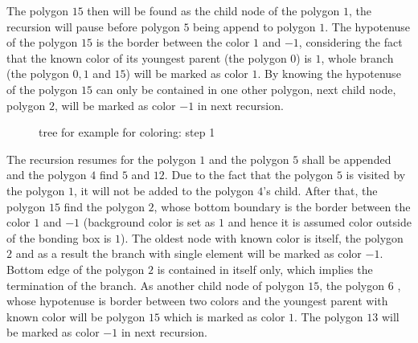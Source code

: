 The polygon $15$ then will be found as the child node of the polygon $1$, the recursion will pause before polygon $5$ being append to polygon $1$.
The hypotenuse of the polygon $15$ is the border between the color $1$ and $-1$, considering the fact that the known color of its youngest parent (the polygon $0$) is $1$, whole branch (the polygon $0,1$ and $15$) will be marked as color $1$.
By knowing the hypotenuse of the polygon $15$ can only be contained in one other polygon, next child node, polygon $2$, will be marked as color $-1$ in next recursion.
    \begin{figure}[h!]
        \centering
        \caption[Tree for example for coloring: step 1]{tree for example for coloring: step 1}
        \label{qdt_fig:qdt_color_tree_0}
    \end{figure}
The recursion resumes for the polygon $1$ and the polygon $5$ shall be appended and the polygon $4$ find $5$ and $12$.
Due to the fact that the polygon $5$ is visited by the polygon $1$, it will not be added to the polygon $4$'s child.
After that, the polygon $15$ find the polygon $2$, whose bottom boundary is the border between the color $1$ and $-1$ (background color is set as $1$ and hence it is assumed color outside of the bonding box is $1$).
The oldest node with known color is itself, the polygon $2$ and as a result the branch with single element will be marked as color $-1$.
Bottom edge of the polygon $2$ is contained in itself only, which implies the termination of the branch.
As another child node of polygon $15$, the polygon $6$ , whose hypotenuse is border between two colors and the youngest parent with known color will be polygon $15$ which is marked as color $1$.
The polygon $13$ will be marked as color $-1$ in next recursion.

